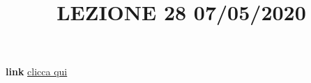 \newline
\newline
\title{LEZIONE 28 07/05/2020}\newline
\textbf{link} \href{https://web.microsoftstream.com/video/baa7a2ec-0ba4-4a8b-b3a9-0c45ccf1b6dd?list=user&userId=faa91214-a6f5-40d7-8875-253fd49b8ce1}{clicca qui}